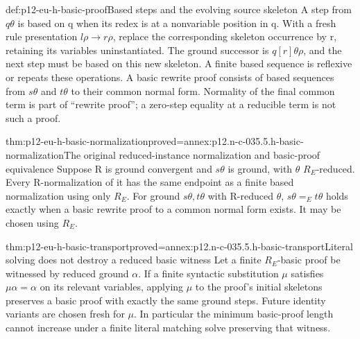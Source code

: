 \begin{hbdefinition}{def:p12-eu-h-basic-proof}{Based steps and the evolving source skeleton}
A step from \(q\theta\) is based on q when its redex is at a
nonvariable position in q. With a fresh rule presentation
\(l\rho\to r\rho\), replace the corresponding skeleton
occurrence by r, retaining its variables uninstantiated. The ground
successor is \(q[r]\theta\rho\), and the next step must be based
on this new skeleton. A finite based sequence is reflexive or repeats
these operations. A basic rewrite proof consists of based sequences
from \(s\theta\) and \(t\theta\) to their common normal form.
Normality of the final common term is part of ``rewrite proof'';
a zero-step equality at a reducible term is not such a proof.
\cite[Definition 4.6 and preceding convention, pp.~488,490]{BaaderSnyder2001}
\end{hbdefinition}

\begin{hbtheorem}{thm:p12-eu-h-basic-normalization}{proved=annex:p12.n-c-035.5.h-basic-normalization}{The original reduced-instance normalization and basic-proof equivalence}
Suppose R is ground convergent and \(s\theta\) is ground, with
\(\theta\) \(R_E\)-reduced. Every R-normalization of it has the
same endpoint as a finite based normalization using only \(R_E\).
For ground \(s\theta,t\theta\) with R-reduced \(\theta\),
\(s\theta=_E t\theta\) holds exactly when a basic rewrite proof
to a common normal form exists. It may be chosen using \(R_E\).
\cite[Lemma 4.7 and Corollary 4.8, p.~491]{BaaderSnyder2001}
\end{hbtheorem}

\begin{hblemma}{thm:p12-eu-h-basic-transport}{proved=annex:p12.n-c-035.5.h-basic-transport}{Literal solving does not destroy a reduced basic witness}
Let a finite \(R_E\)-basic proof be witnessed by reduced ground
\(\alpha\). If a finite syntactic substitution \(\mu\) satisfies
\(\mu\alpha=\alpha\) on its relevant variables, applying \(\mu\)
to the proof's initial skeletons preserves a basic proof with exactly
the same ground steps. Future identity variants are chosen fresh for
\(\mu\). In particular the minimum basic-proof length cannot
increase under a finite literal matching solve preserving that witness.
\end{hblemma}

